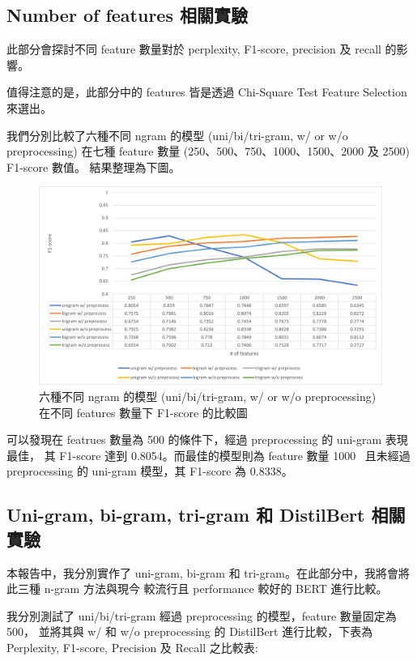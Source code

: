 \documentclass{article}[12pt]
\begin{document}
\subsection{Number of features 相關實驗}
此部分會探討不同 feature 數量對於 perplexity, F1-score, precision 及 recall
的影響。

值得注意的是，此部分中的 features 皆是透過 Chi-Square Test Feature Selection 來選出。

我們分別比較了六種不同 ngram 的模型 (uni/bi/tri-gram, w/ or w/o preprocessing)
在七種 feature 數量 (250、500、750、1000、1500、2000 及 2500) F1-score 數值。
結果整理為下圖。

\begin{figure}[H]
    \centering
    \includegraphics[width=\textwidth]{figure/features.png}
    \caption{六種不同 ngram 的模型 (uni/bi/tri-gram, w/ or w/o preprocessing) 在不同 features 數量下 F1-score 的比較圖}
\end{figure}

可以發現在 featrues 數量為 500 的條件下，經過 preprocessing 的 uni-gram 表現最佳，
其 F1-score 達到 0.8054。而最佳的模型則為 feature 數量 1000 \
且未經過 preprocessing 的 uni-gram 模型，其 F1-score 為 0.8338。



\subsection{Uni-gram, bi-gram, tri-gram 和 DistilBert 相關實驗}
本報告中，我分別實作了 uni-gram, bi-gram 和 tri-gram。在此部分中，我將會將此三種 n-gram 方法與現今
較流行且 performance 較好的 BERT 進行比較。

我分別測試了 uni/bi/tri-gram 經過 preprocessing 的模型，feature 數量固定為 500，
並將其與 w/ 和 w/o preprocessing 的 DistilBert 進行比較，下表為 
Perplexity, F1-score, Precision 及 Recall 之比較表:
\end{document}
